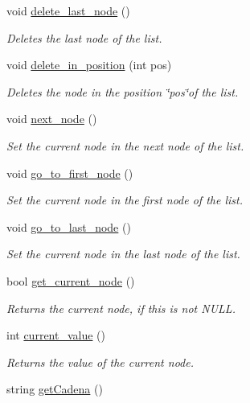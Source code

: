 \begin{DoxyCompactItemize}
void \hyperlink{classlist_a940e14191c9749919d81be840b1ce163}{delete\-\_\-last\-\_\-node} ()
\begin{DoxyCompactList}\small\item\em Deletes the last node of the list. \end{DoxyCompactList}\item 
void \hyperlink{classlist_aad82eb6c4ac56b4d52ceb292aef40232}{delete\-\_\-in\-\_\-position} (int pos)
\begin{DoxyCompactList}\small\item\em Deletes the node in the position \char`\"{}pos\char`\"{}of the list. \end{DoxyCompactList}\item 
void \hyperlink{classlist_ab11707b9d85a5c33d0bebf8944c0e857}{next\-\_\-node} ()
\begin{DoxyCompactList}\small\item\em Set the current node in the next node of the list. \end{DoxyCompactList}\item 
void \hyperlink{classlist_afb9c1a47eb001496eabd2d3ac37d283d}{go\-\_\-to\-\_\-first\-\_\-node} ()
\begin{DoxyCompactList}\small\item\em Set the current node in the first node of the list. \end{DoxyCompactList}\item 
void \hyperlink{classlist_a3d9c0dd74589893d2e8337f6b2fa78ac}{go\-\_\-to\-\_\-last\-\_\-node} ()
\begin{DoxyCompactList}\small\item\em Set the current node in the last node of the list. \end{DoxyCompactList}\item 
bool \hyperlink{classlist_af3be16d99b45856c9222dec685628122}{get\-\_\-current\-\_\-node} ()
\begin{DoxyCompactList}\small\item\em Returns the current node, if this is not N\-U\-L\-L. \end{DoxyCompactList}\item 
int \hyperlink{classlist_a4a401135cd9300328664b4295f8bcbb1}{current\-\_\-value} ()
\begin{DoxyCompactList}\small\item\em Returns the value of the current node. \end{DoxyCompactList}\item 
string \hyperlink{classlist_af9c57f43f632e0c885c2393dc375ccf9}{get\-Cadena} ()

\end{DoxyCompactItemize}
